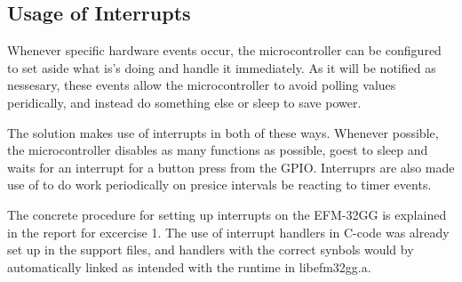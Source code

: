 \subsection{Usage of Interrupts}
Whenever specific hardware events occur, the microcontroller can be configured to set aside what is's doing and handle it immediately.
As it will be notified as nessesary, these events allow the microcontroller to avoid polling values peridically, and instead do something else or sleep to save power.

The solution makes use of interrupts in both of these ways.
Whenever possible, the microcontroller disables as many functions as possible, goest to sleep and waits for an interrupt for a button press from the GPIO.
Interruprs are also made use of to do work periodically on presice intervals be reacting to timer events.

The concrete procedure for setting up interrupts on the EFM-32GG is explained in the report for excercise 1\cite{ex1-report}.
The use of interrupt handlers in C-code was already set up in the support files, and handlers with the correct synbols would by automatically linked as intended with the runtime in libefm32gg.a.
